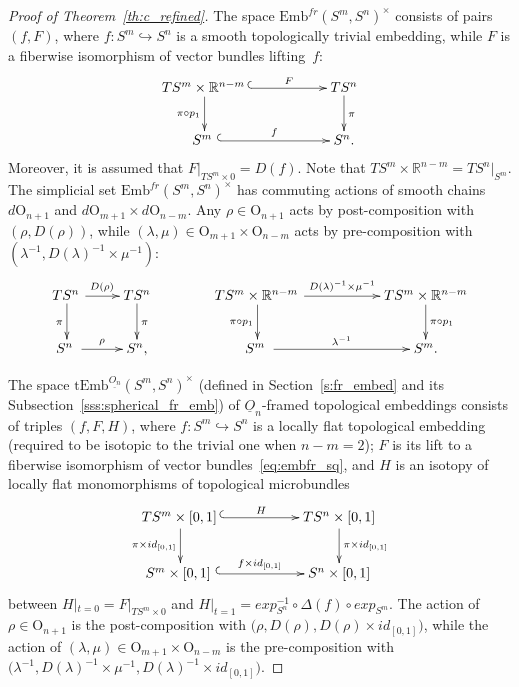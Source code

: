 \documentclass[11pt]{amsart}
\theoremstyle{definition}
\newcommand{\R}{{\mathbb R}}
\newcommand{\Embfr}{\mathrm{Emb}^{fr}}
\newcommand{\tEmb}{\mathrm{tEmb}}
\newcommand{\OO}{\mathrm{O}}
\numberwithin{equation}{section}
\begin{document}
\begin{proof}[Proof of Theorem~\ref{th:c_refined}]
The space $\Embfr(S^m,S^n)^\times$ consists of pairs $(f,F)$, where $f\colon S^m\hookrightarrow S^n$ is a smooth topologically trivial embedding, while $F$ is a fiberwise isomorphism of vector bundles lifting~$f$:
\begin{equation}\label{eq:embfr_sq}
\xymatrix{
TS^m\times\R^{n-m}\,\ar@{^{(}->}[rr]^-F \ar[d]_{\pi\circ p_1}&& TS^n\ar[d]^\pi\\
S^m\,\,\ar@{^{(}->}[rr]^f&&S^n.
}
\end{equation}
Moreover, it is assumed that $F|_{TS^m\times 0}=D(f)$. Note that $TS^m\times\R^{n-m}=TS^n|_{S^m}$. The simplicial set $\Embfr(S^m,S^n)^\times$ has commuting actions of smooth chains  $d\OO_{n+1}$ and 
$d\OO_{m+1}\times d\OO_{n-m}$. Any $\rho\in \OO_{n+1}$ acts by post-composition with $(\rho,D(\rho))$, while $(\lambda,\mu)\in\OO_{m+1}\times\OO_{n-m}$ acts by pre-composition with $(\lambda^{-1},D(\lambda)^{-1}\times \mu^{-1})$:
\[ %
\xymatrix{
TS^n\,\ar[r]^{D(\rho)} \ar[d]_{\pi}& TS^n\ar[d]^\pi\\
S^n\,\,\ar[r]^{\rho}&S^n,
}
\qquad\qquad
\xymatrix{
TS^m\times\R^{n-m}\,\ar[rr]^-{D(\lambda)^{-1}\times\mu^{-1}} \ar[d]_{\pi\circ p_1}&& TS^m\times\R^{n-m}\ar[d]^{\pi\circ p_1}\\
S^m\,\,\ar[rr]^{\lambda^{-1}}&&S^m.
}
\] %

The space $\tEmb^{\underline{O_n}}(S^m,S^n)^\times$ (defined in Section~\ref{s:fr_embed} and its Subsection~\ref{sss:spherical_fr_emb}) of ${\underline O_n}$-framed topological embeddings consists
of triples $(f,F,H)$, where $f\colon S^m\hookrightarrow S^n$ is a locally flat topological embedding (required to be isotopic to the trivial one when $n-m=2$); $F$ is its lift to a fiberwise isomorphism of vector bundles~\eqref{eq:embfr_sq}, and
$H$ is an isotopy of locally flat monomorphisms of topological microbundles
\begin{equation}\label{eq:embfr_sq2}
\xymatrix{
TS^m\times[0,1]\,\ar@{^{(}->}[rr]^-H \ar[d]_{\pi\times id_{[0,1]}}&& TS^n\times[0,1]\ar[d]^{\pi\times id_{[0,1]}}\\
S^m\times[0,1]\,\,\ar@{^{(}->}[rr]^{f\times id_{[0,1]}}&&S^n\times [0,1]
}
\end{equation}
between $H|_{t=0}=F|_{TS^m\times 0}$ and $H|_{t=1}=exp_{S^n}^{-1}\circ\Delta(f)\circ exp_{S^m}$. The action of $\rho\in\OO_{n+1}$ is the post-composition with $\bigl(\rho,D(\rho),D(\rho)\times id_{[0,1]}\bigr)$, while
the action of $(\lambda,\mu)\in \OO_{m+1}\times\OO_{n-m}$ is the pre-composition with $\bigl(\lambda^{-1}, D(\lambda)^{-1}\times\mu^{-1}, D(\lambda)^{-1}\times id_{[0,1]}\bigr)$.


\end{proof}
\end{document}
